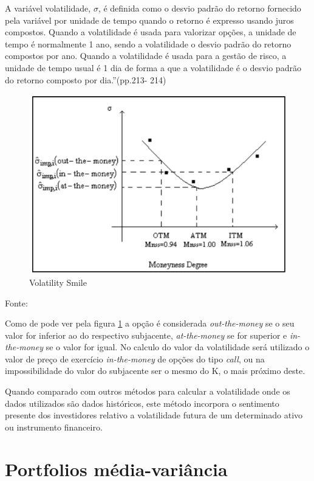 \documentclass[
  12pt,
  a4paper,
  openany]{book}
\begin{document}
A variável volatilidade, \(\sigma\), é definida como o desvio padrão do retorno fornecido pela
variável por unidade de tempo quando o retorno é expresso usando juros compostos.
Quando a volatilidade é usada para valorizar opções, a unidade de tempo é normalmente 1 ano, sendo a volatilidade o desvio padrão do retorno compostos por ano.
Quando a volatilidade é usada para a gestão de risco, a unidade de tempo usual é 1 dia
de forma a que a volatilidade é o desvio padrão do retorno composto por dia.''(pp.213-
214)

\begin{figure}

{\centering \includegraphics[width=0.6\linewidth]{image/volatilitysmile} 

}

\caption{Volatility Smile}\label{fig:volatilitysmile}
\end{figure}
\FloatBarrier
\centering

Fonte: \citep[pp.182]{volatilitysmile}

\justifying
\bigskip

Como de pode ver pela figura \ref{fig:volatilitysmile} a opção é considerada \emph{out-the-money} se o seu valor for inferior ao do respectivo subjacente, \emph{at-the-money} se for superior e \emph{in-the-money} se o valor for igual. No calculo do valor da volatilidade será utilizado o valor de preço de exercício \emph{in-the-money} de opções do tipo \emph{call}, ou na impossibilidade do valor do subjacente ser o mesmo do K, o mais próximo deste.

Quando comparado com outros métodos para calcular a volatilidade onde os dados utilizados são dados históricos, este método incorpora o sentimento presente dos investidores relativo a volatilidade futura de um determinado ativo ou instrumento financeiro.

\hypertarget{portfolios-muxe9dia-variuxe2ncia}{%
\section{Portfolios média-variância}\label{portfolios-muxe9dia-variuxe2ncia}}
\end{document}
